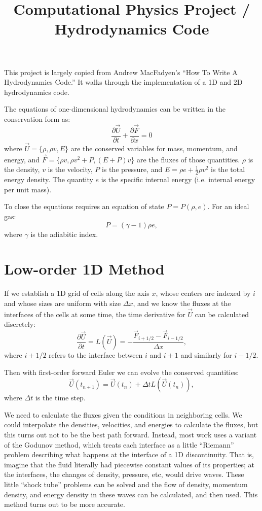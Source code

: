 \documentclass[11pt, preprint]{aastex}
\begin{document}
\title{\bf Computational Physics Project / Hydrodynamics Code}

This project is largely copied from Andrew MacFadyen's ``How To Write
A Hydrodynamics Code.'' It walks through the implementation of a 1D
and 2D hydrodynamics code.

The equations of one-dimensional hydrodynamics can be
written in the conservation form as:
\begin{equation}
\label{eq:conservation}
  \frac{\partial \vec{U}}{\partial t}
  + \frac{\partial \vec{F}}{\partial x} = 0
\end{equation}
where $\vec{U} = \{ \rho, \rho v, E\}$ are the conserved variables for
mass, momentum, and energy, and $\vec{F} = \{ \rho v, \rho v^2 + P, (E
+ P) v\}$ are the fluxes of those quantities. $\rho$ is the density,
$v$ is the velocity, $P$ is the pressure, and $E=\rho e +
\frac{1}{2}\rho v^2$ is the total energy density. The quantity $e$ is
the specific internal energy (i.e. internal energy per unit mass).

To close the equations requires an equation of state $P=P(\rho,
e)$. For an ideal gas:
\begin{equation}
\label{eq:eos}
P = (\gamma - 1)\rho e,
\end{equation}
where $\gamma$ is the adiabitic index.

\section{Low-order 1D Method}

If we establish a 1D grid of cells along the axis $x$, whose centers
are indexed by $i$ and whose sizes are uniform with size $\Delta x$,
and we know the fluxes at the interfaces of the cells at some time,
the time derivative for $\vec{U}$ can be calculated discretely:
\begin{equation}
  \frac{\partial \vec{U}}{\partial t} = L\left(\vec{U}\right)
  = - \frac{\vec{F}_{i+1/2} - \vec{F}_{i-1/2}}{\Delta x},
\end{equation}
where $i+1/2$ refers to the interface between $i$ and $i+1$ and
similarly for $i-1/2$.

Then with first-order forward Euler we can evolve the conserved
quantities:
\begin{equation}
\vec{U}(t_{n+1}) = \vec{U}(t_n) + \Delta t L\left(\vec{U}(t_n)\right),
\end{equation}
where $\Delta t$ is the time step.

We need to calculate the fluxes given the conditions in neighboring
cells. We could interpolate the densities, velocities, and energies to
calculate the fluxes, but this turns out not to be the best path
forward. Instead, most work uses a variant of the Godunov method,
which treats each interface as a little ``Riemann'' problem describing
what happens at the interface of a 1D discontinuity.  That is, imagine
that the fluid literally had piecewise constant values of its
properties; at the interfaces, the changes of density, pressure, etc,
would drive waves. These little ``shock tube'' problems can be solved
and the flow of density, momentum density, and energy density in these
waves can be calculated, and then used. This method turns out to be
more accurate.
\end{document}
